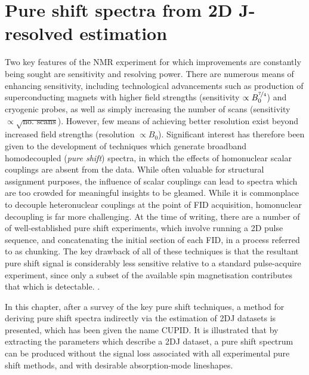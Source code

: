 \chapter{Pure shift spectra from 2D J-resolved estimation}
\label{chap:cupid}
Two key features of the \ac{NMR} experiment for which improvements are
constantly being sought are sensitivity and resolving power. There are numerous
means of enhancing sensitivity, including technological advancements such as
production of superconducting magnets with higher field
strengths\cite{Maeda2019} (sensitivity $\propto B_0^{\nicefrac{7}{4}}$) and
cryogenic probes\cite{Styles1984,Styles1989,Kovacs2005}, as well as simply
increasing the number of scans (sensitivity $\propto \sqrt{\text{no. scans}}$).
However, few means of achieving better resolution exist beyond increased field
strengths (resolution $\propto B_0$).  Significant interest has therefore been given to the
development of techniques which generate broadband homodecoupled (\emph{pure
shift}) spectra, in which the effects of homonuclear scalar couplings are
absent from the data. While often valuable for structural assignment purposes,
the influence of scalar couplings can lead to spectra which are too crowded for
meaningful insights to be gleamed. While it is commonplace to decouple
heteronuclear couplings at the point of \ac{FID} acquisition\cite{Shaka1983a,
Shaka1983b,Shaka1985}, homonuclear decoupling is far more challenging. At
the time of writing, there are a number of of well-established pure shift
experiments, which involve running a \ac{2D} pulse sequence, and concatenating
the initial section of each \ac{FID}, in a process referred to as
chunking\cite{Meyer2013,Adams2014,Zangger2015}. The key drawback of all of
these techniques is that the resultant pure shift signal is considerably less sensitive relative to a standard pulse-acquire experiment, since only a subset
 of the available spin magnetisation
contributes that which is detectable.
.

In this chapter, after a survey of the key pure shift techniques, a method for
deriving pure shift spectra indirectly via the estimation of \ac{2DJ} datasets
is presented, which has been given the name \acf{CUPID}. It is illustrated that
by extracting the parameters which describe a \ac{2DJ} dataset, a pure shift
spectrum can be produced without the signal loss associated with all
experimental pure shift methods, and with desirable absorption-mode lineshapes.






